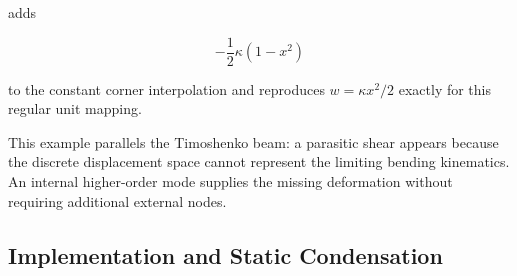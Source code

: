 adds

\begin{equation}
    -\frac{1}{2}\kappa(1-x^2)
\end{equation}

to the constant corner interpolation and reproduces
$w=\kappa x^2/2$ exactly for this regular unit mapping.

This example parallels the Timoshenko beam: a parasitic shear appears because
the discrete displacement space cannot represent the limiting bending
kinematics. An internal higher-order mode supplies the missing deformation
without requiring additional external nodes.

\subsection{Implementation and Static Condensation}

